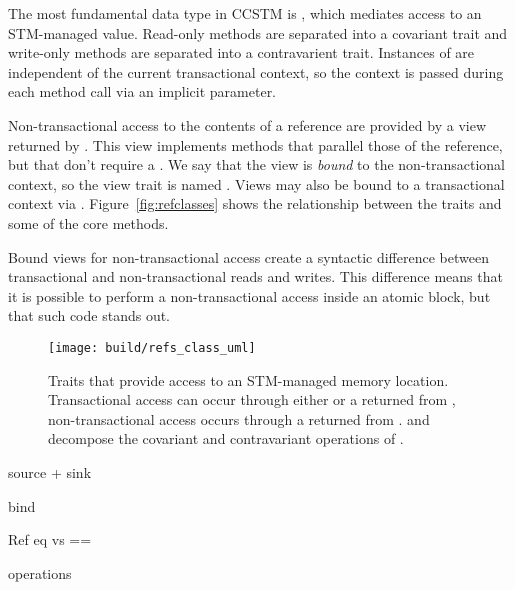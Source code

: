 The most fundamental data type in CCSTM is , which mediates
access to an STM-managed value.  Read-only methods are separated into
a covariant  trait and write-only methods are separated
into a contravarient  trait.  Instances of  are
independent of the current transactional context, so the context is
passed during each method call via an implicit parameter.

Non-transactional access to the contents of a reference are provided by
a view returned by .  This view implements methods that
parallel those of the reference, but that don't require a .
We say that the view is \textit{bound} to the non-transactional
context, so the view trait is named .  Views may
also be bound to a transactional context via .
Figure~\ref{fig:refclasses} shows the  relationship
between the traits and some of the core methods.

Bound views for non-transactional access create a syntactic difference
between transactional and non-transactional reads and writes.  This
difference means that it is possible to perform a non-transactional
access inside an atomic block, but that such code stands out.

\begin{figure*}
  \centering
  \texttt{[image: build/refs\_class\_uml]}

\caption{Traits that provide access to an STM-managed memory
location.  Transactional access can occur through either 
or a  returned from ,
non-transactional access occurs through a  returned
from .   and 
decompose the covariant and contravariant operations of .}

\label{fig:refsclasses}
\end{figure*}

source + sink

bind

Ref eq vs ==

operations
